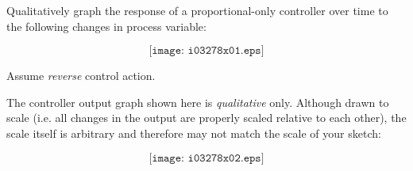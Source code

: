 

Qualitatively graph the response of a proportional-only controller over time to the following changes in process variable:

$$\texttt{[image: i03278x01.eps]}$$

Assume {\it reverse} control action.
 






The controller output graph shown here is {\it qualitative} only.  Although drawn to scale (i.e. all changes in the output are properly scaled relative to each other), the scale itself is arbitrary and therefore may not match the scale of your sketch:

$$\texttt{[image: i03278x02.eps]}$$











